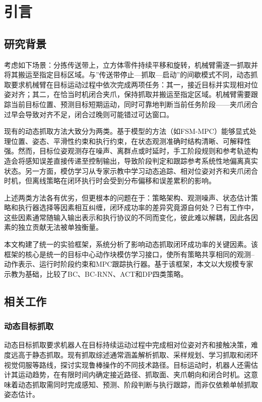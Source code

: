 \chapter{引言}\label{chap:introduction}

\section{研究背景}

考虑如下场景：分拣传送带上，立方体零件持续平移和旋转，机械臂需逐一抓取并将其搬运至指定目标区域。与”传送带停止—抓取—启动”的间歇模式不同，动态抓取要求机械臂在目标运动过程中依次完成两项任务：其一，接近目标并实现相对位姿对齐；其二，在恰当时机闭合夹爪，保持抓取并搬运至指定区域\citep{marturi2019dynamic,zhang2022robotic,newbury2023deep}。机械臂需要跟踪当前目标位置、预测目标短期运动，同时可靠地判断当前任务阶段——夹爪闭合过早会导致对齐不足，闭合过晚则可能错过可达窗口。

现有的动态抓取方法大致分为两类。基于模型的方法（如FSM-MPC）能够显式处理位置、姿态、平滑性约束和执行约束，在状态观测准确时结构清晰、可解释性强\citep{rawlings2017model,nubert2020safe}。然而，目标位姿观测存在噪声、离群点或时延时，手工阶段规则和参考轨迹构造会将感知误差直接传递至控制输出，导致阶段判定和跟踪参考系统性地偏离真实状态。另一方面，模仿学习从专家示教中学习动态追踪、相对位姿对齐和夹爪闭合时机\citep{argall2009survey}，但离线策略在闭环执行时会受到分布偏移和误差累积的影响\citep{ross2010efficient,ross2011reduction}。

上述两类方法各有优劣，但更根本的问题在于：策略架构、观测噪声、状态估计策略和执行器选择等因素相互纠缠，闭环成功率的差异究竟源自何处？已有工作中，这些因素通常随输入输出表示和执行协议的不同而变化，彼此难以解耦，因此各因素的独立贡献无法被单独衡量。

本文构建了统一的实验框架，系统分析了影响动态抓取闭环成功率的关键因素。该框架的核心是统一的目标中心动作块模仿学习接口，使所有策略共享相同的观测--动作表示、运行时阶段约束和MPC跟踪执行器。基于该框架，本文以大规模专家示教为基础，比较了BC、BC-RNN、ACT和DP四类策略。

\section{相关工作}
\label{sec:related-work}

\subsection{动态目标抓取}

动态目标抓取要求机器人在目标持续运动过程中完成相对位姿对齐和接触决策，难度远高于静态抓取。现有抓取综述通常涵盖解析抓取、采样规划、学习抓取和闭环视觉伺服等路线，探讨实现鲁棒操作的不同技术路径\citep{zhang2022robotic,newbury2023deep}。目标运动时，机器人还需估计其运动趋势，在有限时间内确定接近路径、抓取面、夹爪朝向和闭合时机\citep{marturi2019dynamic,alshanoon2022robotic}。这意味着动态抓取需同时完成感知、预测、阶段判断与执行跟踪，而非仅依赖单帧抓取姿态估计。

